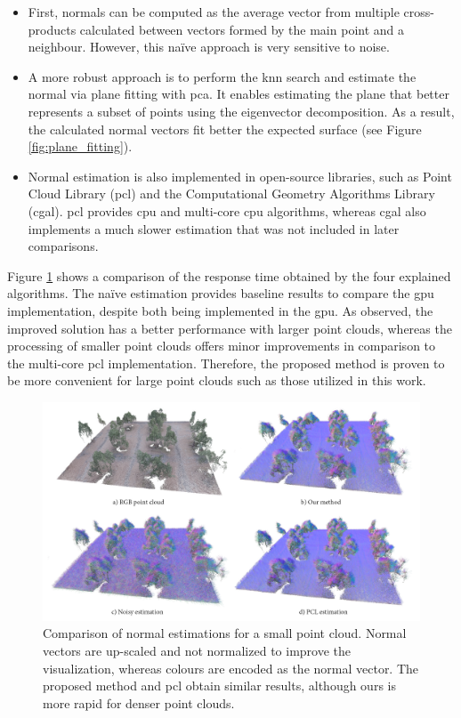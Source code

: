 \begin{itemize}
    \item First, normals can be computed as the average vector from multiple cross-products calculated between vectors formed by the main point and a neighbour. However, this naïve approach is very sensitive to noise.
    \item A more robust approach is to perform the \acrshort{knn} search and estimate the normal via plane fitting with \acrshort{pca}. It enables estimating the plane that better represents a subset of points \cite{sanchez_robust_2020} using the eigenvector decomposition. As a result, the calculated normal vectors fit better the expected surface (see Figure \ref{fig:plane_fitting}).
    \item Normal estimation is also implemented in open-source libraries, such as Point Cloud Library (\acrshort{pcl}) and the Computational Geometry Algorithms Library (\acrshort{cgal}). \acrshort{pcl} provides \acrshort{cpu} and multi-core \acrshort{cpu} algorithms, whereas \acrshort{cgal} also implements a much slower estimation that was not included in later comparisons.
\end{itemize}

Figure \ref{fig:thermal_normal_estimation} shows a comparison of the response time obtained by the four explained algorithms. The naïve estimation provides baseline results to compare the \acrshort{gpu} implementation, despite both being implemented in the \acrshort{gpu}. As observed, the improved solution has a better performance with larger point clouds, whereas the processing of smaller point clouds offers minor improvements in comparison to the multi-core \acrshort{pcl} implementation. Therefore, the proposed method is proven to be more convenient for large point clouds such as those utilized in this work.

\begin{figure} 
    \centering
    \includegraphics[width=\linewidth]{figs/thermal_projection/normal_estimation.png}
	\caption{Comparison of normal estimations for a small point cloud. Normal vectors are up-scaled and not normalized to improve the visualization, whereas colours are encoded as the normal vector. The proposed method and \acrshort{pcl} obtain similar results, although ours is more rapid for denser point clouds.}
	\label{fig:thermal_normal_estimation}
\end{figure}

